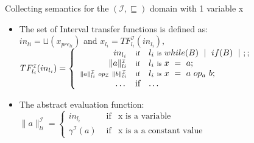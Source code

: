 \begin{frame}{Collecting semantics for the $(\mathcal{I},\sqsubseteq)$  domain with 1 variable x}
\begin{itemize}
	\item \scriptsize The set of Interval transfer functions is defined as:\\$in_{li}=\sqcup(x_{pre_{li}})$ and $ x_{l_i}= TF^{\scriptscriptstyle \mathcal{I}}_{l_i}(in_{l_i}),$\\ 
	$  TF^{\scriptscriptstyle \mathcal{I}}_{l_i}(in_{l_i}) =     \left\{ \begin{array}{rcl}
	\textstyle	in_{l_i} &  \mbox{\scriptsize if}& \textstyle l_i~\text{\scriptsize is}~while(B)~\mid~ if(B) ~\mid~;;   \\
	\textstyle	\|a\|_{li}^{\scriptscriptstyle \mathcal{I}}  & \mbox{\scriptsize if} & \textstyle l_i~\mbox{\scriptsize is}~x~=~a; \\
	\scriptstyle	\|a\|_{li}^{\scriptscriptstyle \mathcal{I}}~op_\mathcal{I}~ \|b\|_{li}^{\scriptscriptstyle \mathcal{I}}  & \mbox{\scriptsize if} &  \textstyle l_i~\mbox{\scriptsize is}~x~=~a~op_a~b; \\
	\dots & \mbox{if} & \dots
	\end{array}\right.$
	
	\item \scriptsize The abstract evaluation function:\\  $ \|a\|_{li}^ {\scriptscriptstyle \mathcal{I}} =     \left\{ \begin{array}{rcl}
	in_{l_i} & \mbox{ if}&  \text{x is a variable}   \\
	\gamma^{\scriptscriptstyle \mathcal{I}}(a)  & \mbox{ if} &  \text{x is a a constant value} 
	\end{array}\right.$
\end{itemize}

\end{frame}

